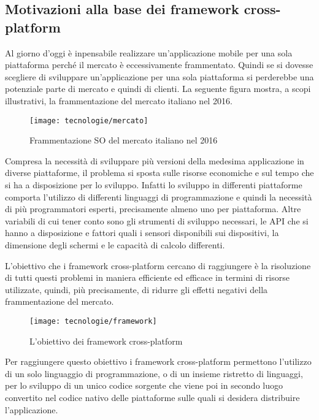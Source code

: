 \subsection{Motivazioni alla base dei framework cross-platform}

Al giorno d'oggi è inpensabile realizzare un'applicazione mobile per una sola piattaforma perché il mercato è eccessivamente frammentato. Quindi se si dovesse scegliere di sviluppare un'applicazione per una sola piattaforma si perderebbe una potenziale parte di mercato e quindi di clienti. La seguente figura mostra, a scopi illustrativi, la frammentazione del mercato italiano nel 2016.

\begin{figure}[!h] 
    \centering 
    \texttt{[image: tecnologie/mercato]} 
    \caption{Frammentazione SO del mercato italiano nel 2016}
\end{figure}

Compresa la necessità di sviluppare più versioni della medesima applicazione in diverse piattaforme, il problema si sposta sulle risorse economiche e sul tempo che si ha a disposizione per lo sviluppo. Infatti lo sviluppo in differenti piattaforme comporta l'utilizzo di differenti linguaggi di programmazione e quindi la necessità di più programmatori esperti, precisamente almeno uno per piattaforma. Altre variabili di cui tener conto sono gli strumenti di sviluppo necessari, le API che si hanno a disposizione e fattori quali i sensori disponibili sui dispositivi, la dimensione degli schermi e le capacità di calcolo differenti.

L'obiettivo che i framework cross-platform cercano di raggiungere è la risoluzione di tutti questi problemi in maniera efficiente ed efficace in termini di risorse utilizzate, quindi, più precisamente, di ridurre gli effetti negativi della frammentazione del mercato.

\begin{figure}[!h] 
    \centering 
    \texttt{[image: tecnologie/framework]} 
    \caption{L'obiettivo dei framework cross-platform}
\end{figure}

Per raggiungere questo obiettivo i framework cross-platform permettono l'utilizzo di un solo linguaggio di programmazione, o di un insieme ristretto di linguaggi, per lo sviluppo di un unico codice sorgente che viene poi in secondo luogo convertito nel codice nativo delle piattaforme sulle quali si desidera distribuire l'applicazione. 

